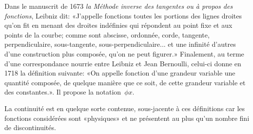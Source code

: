 \medskip
\begin{histoire}%
Dans le manuscrit de 1673 \emph{la Méthode inverse des tangentes ou à propos des fonctions}, Leibniz dit:  «J'appelle fonctions toutes les portions des lignes droites qu'on fit en menant des droites indéfinies qui répondent au point fixe et aux points de la courbe; comme sont abscisse, ordonnée, corde, tangente, perpendiculaire, sous-tangente, sous-perpendiculaire... et une infinité d'autres d'une construction plus composée, qu'on ne peut figurer.»
Finalement, au terme d'une correspondance nourrie entre Leibniz et Jean Bernoulli, celui-ci donne en 1718 la définition suivante: «On appelle fonction d'une grandeur variable une quantité composée, de quelque manière que ce soit, de cette grandeur variable et des constantes.».
Il propose la notation~$\phi x$.

La continuité est en quelque sorte contenue, sous-jacente à ces définitions car les fonctions considérées sont «physiques» et ne présentent au plus qu'un nombre fini de discontinuités.


\end{histoire}
